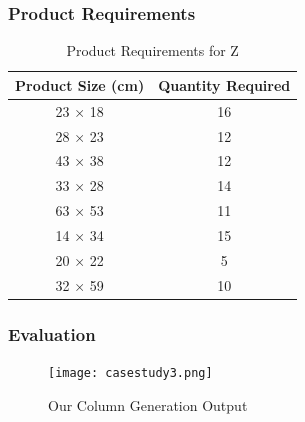 \documentclass[a4paper]{article}
\begin{document}
\subsubsection*{Product Requirements}
\begin{table}[H]
    \centering
    \caption{Product Requirements for Z}
    \begin{tabular}{|c|c|}
        \hline
        \textbf{Product Size (cm)} & \textbf{Quantity Required} \\ \hline
        23 × 18 & 16 \\ \hline
        28 × 23 & 12 \\ \hline
        43 × 38 & 12 \\ \hline
        33 × 28 & 14 \\ \hline
        63 × 53 & 11 \\ \hline
        14 × 34 & 15 \\ \hline
        20 × 22 & 5 \\ \hline
        32 × 59 & 10 \\ \hline
    \end{tabular}
\end{table}
\subsubsection*{Evaluation}
\begin{figure}[H]
    \centering
     \captionsetup{justification=centering, font=small} %
    \texttt{[image: casestudy3.png]}
    \vspace{0.4cm}
    \caption*{Our Column Generation Output}
     \label{fig:1}
\end{figure}
\end{document}
